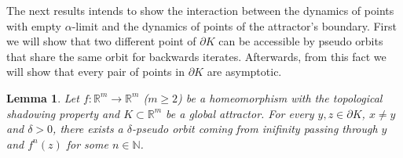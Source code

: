 \documentclass{amsart}
\newtheorem{rmk}{Remark}
\newtheorem{lemma}{Lemma}
\newcommand{\R}{{\mathbb{R}}}
\newcommand{\N}{{\mathbb{N}}}
\def\blacksquare{\hbox{\vrule width 4pt height 4pt depth 0pt}}
\def\qed{\ \ \ \hbox{}\nolinebreak\hfill $\blacksquare \  \  \  \  $ \par{}\medskip}
\begin{document}
	
	
	
	
	
	
	
	The next results intends to show the interaction between the dynamics of points with empty $\alpha$-limit and the dynamics of points of the attractor's boundary.
	First we will show that two different point of $\partial K$ can be accessible by pseudo orbits  that share the same orbit  for backwards iterates.
	Afterwards, from this fact we will show  that every pair of points in $\partial K$ are asymptotic. %
	
	
	\begin{lemma}\label{po_conecta}
		Let   $f:\R^m\to \R^m$ ($m\geq2$) be a  homeomorphism with the topological shadowing property and   $K\subset \R^m$ be a  global attractor. %
		For every  $y, z\in \partial K$, $x\neq y$ and $\delta>0$,   there exists a $\delta$-pseudo orbit coming from inifinity passing through $y$ and $f^n(z)$ for some $n\in \N$.
	\end{lemma}	
	
\end{document}
